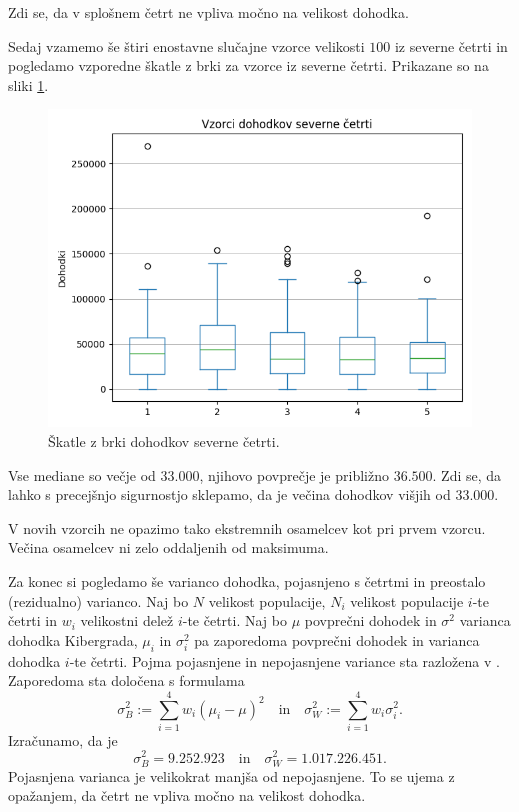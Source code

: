 \documentclass[12pt, a4paper]{article}
\begin{document}
Zdi se, da v splošnem četrt ne vpliva močno na velikost dohodka.

Sedaj vzamemo še štiri enostavne slučajne vzorce velikosti $100$ 
iz severne četrti in pogledamo vzporedne škatle z brki za vzorce
iz severne četrti. Prikazane so na sliki \ref{img:sever}.
\begin{figure}[H]
    \centering
    \includegraphics[width=12cm]{Slike/sever.png}
    \caption{Škatle z brki dohodkov severne četrti.}
    \label{img:sever}
\end{figure}
Vse mediane so večje od $33.000$, njihovo povprečje je približno 
$36.500$. Zdi se, da lahko s precejšnjo sigurnostjo sklepamo, da je večina 
dohodkov višjih od $33.000$.

V novih vzorcih ne opazimo tako ekstremnih osamelcev kot pri prvem vzorcu. Večina 
osamelcev ni zelo oddaljenih od maksimuma.

Za konec si pogledamo še varianco dohodka, pojasnjeno s četrtmi in preostalo
(rezidualno) varianco. Naj bo $N$ velikost populacije, $N_i$ velikost 
populacije $i$-te četrti in $w_i$ velikostni delež $i$-te četrti. Naj bo
$\mu$ povprečni dohodek in $\sigma^2$ varianca dohodka Kibergrada,
$\mu_i$ in $\sigma_i^2$ pa zaporedoma povprečni dohodek in varianca 
dohodka $i$-te četrti. 
Pojma pojasnjene in nepojasnjene variance sta razložena v 
\cite{raic}. Zaporedoma sta določena s formulama
\[
    \sigma^2_B := \sum_{i=1}^{4} w_i(\mu_i - \mu)^2
    \quad \text{in} \quad
    \sigma^2_W := \sum_{i=1}^{4} w_i\sigma_i^2.
\]
Izračunamo, da je 
\[
    \sigma^2_B = 9.252.923
    \quad \text{in} \quad
    \sigma^2_W = 1.017.226.451.
\]
Pojasnjena varianca je velikokrat manjša od nepojasnjene.
To se ujema z opažanjem, da četrt ne vpliva močno na velikost dohodka.
\newpage
\end{document}
